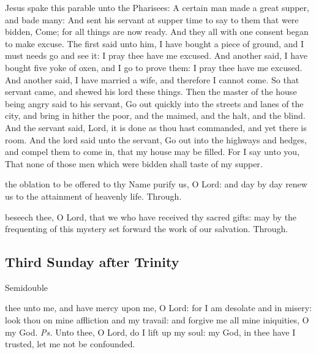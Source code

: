  Jesus spake this parable unto the Pharisees: A certain man made a great supper, and bade many: And sent his servant at supper time to say to them that were bidden, Come; for all things are now ready. And they all with one consent began to make excuse. The first said unto him, I have bought a piece of ground, and I must needs go and see it: I pray thee have me excused. And another said, I have bought five yoke of oxen, and I go to prove them: I pray thee have me excused. And another said, I have married a wife, and therefore I cannot come. So that servant came, and shewed his lord these things. Then the master of the house being angry said to his servant, Go out quickly into the streets and lanes of the city, and bring in hither the poor, and the maimed, and the halt, and the blind. And the servant said, Lord, it is done as thou hast commanded, and yet there is room. And the lord said unto the servant, Go out into the highways and hedges, and compel them to come in, that my house may be filled. For I say unto you, That none of those men which were bidden shall taste of my supper.


\secret
{} the oblation to be offered to thy Name purify us, O Lord: and day by day renew us to the attainment of heavenly life. Through.



\postcommunion
{} beseech thee, O Lord, that we who have received thy sacred gifts: may by the frequenting of this mystery set forward the work of our salvation. Through.


\clearpage
\subsection{Third Sunday after Trinity}\label{TrinityIII}
\begin{inhead}
    {Semidouble}
\end{inhead}


\introit
{} thee unto me, and have mercy upon me, O Lord: for I am desolate and in misery: look thou on mine affliction and my travail: and forgive me all mine iniquities, O my God. \textit{Ps.} Unto thee, O Lord, do I lift up my soul: my God, in thee have I trusted, let me not be confounded.

